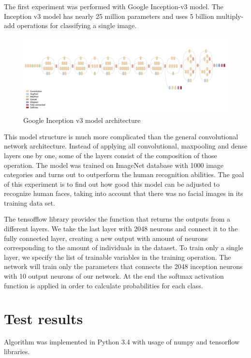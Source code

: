 The first experiment was performed with Google Inception-v3 model. The Inception v3 model has nearly 25 million parameters and uses 5 billion multiply-add operations for classifying a single image.

\begin{figure}[H]
\centering
\includegraphics[scale=0.5]{img/inception_v3_architecture.png}
\caption{Google Inception v3 model architecture}
\end{figure}

This model structure is much more complicated than the general convolutional network architecture. Instead of applying all convolutional, maxpooling and dense layers one by one, some of the layers consist of the composition of those operation. The model was trained on ImageNet database with 1000 image categories and turns out to outperform the human recognition abilities. The goal of this experiment is to find out how good this model can be adjusted to recognize human faces, taking into account that there was no facial images in its training data set. 

The tensofflow library provides the function that returns  the outputs from a different layers. We take the last layer with 2048 neurons and connect it to the fully connected layer, creating a new output with amount of neurons corresponding to the amount of individuals in the dataset. To train only a single layer, we specify the list of trainable variables in the training operation. The network will train only the parameters that connects the 2048 inception neurons with 10 output neurons of our network. At the end the softmax activation function is applied in order to calculate probabilities for each class.


\section{Test results}

Algorithm was implemented in Python 3.4 with usage of numpy and tensorflow libraries. 

